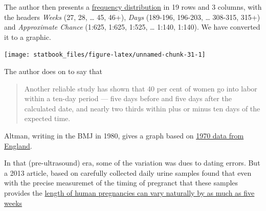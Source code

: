 \documentclass[]{book}
\begin{document}
The author then presents a \href{http://www.biostat.mcgill.ca/hanley/statbook/Guttmacher.pdf\#page=7}{frequency distribution} in 19 rows and 3 columns, with the headers \emph{Weeks} (27, 28, \ldots{} 45, 46+), \emph{Days} (189-196, 196-203, \ldots{} 308-315, 315+) and \emph{Approximate Chance} (1:625, 1:625, 1:525, \ldots{} 1:140, 1:140). We have converted it to a graphic.

\begin{center}\texttt{[image: statbook\_files/figure-latex/unnamed-chunk-31-1]} \end{center}

The author does on to say that

\begin{quote}
Another reliable study has shown that 40 per cent of
women go into labor within a ten-day period --- five days before and five days after the calculated date, and nearly two thirds within plus or minus ten days of the expected time.
\end{quote}

Altman, writing in the BMJ in 1980, gives a graph based on \href{http://www.biostat.mcgill.ca/hanley/statbook/Altman1980.pdf\#page=2}{1970 data from
England}.

In that (pre-ultrasound) era, some of the variation was dues to dating errors. But a 2013 article, based on carefully collected daily urine samples found that even with the precise measuremet of the timing of pregranct that these samples provides the \href{https://www.sciencedaily.com/releases/2013/08/130806203327.htm}{length of human pregnancies can vary naturally by as much as five weeks}
\end{document}
